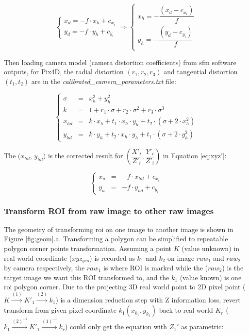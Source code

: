 \documentclass[doublespacing]{configs/bmcart}
\begin{document}
$$
\begin{cases}
  x_d = - f \cdot x_h + c_{x_i} \\
  y_d = - f \cdot y_h + c_{y_i}
\end{cases}
\Rightarrow
\begin{cases}
  x_h  = - \dfrac{(x_d - c_{x_i})}{f} \\
  y_h  = - \dfrac{(y_d - c_{y_i})}{f} \\
\end{cases}
$$

Then loading camera model (camera distortion coefficients) from \acrshort*{sfm} software outputs, for Pix4D, the radial distortion $(r_1, r_2, r_3)$ and tangential distortion $(t_1, t_2)$ are in the \textit{calibrated\_camera\_parameters.txt} file:

$$
  \left\{\begin{array}{lll}
    \sigma & = & x_h^2 + y_h^2 \\
    k      & = & 1 + r_1 \cdot \sigma + r_2 \cdot \sigma^2 + r_3 \cdot \sigma^3 \\
    x_{hd} & = & k \cdot x_h + t_1 \cdot x_h \cdot y_h + t_2 \cdot (\sigma + 2 \cdot x_h^2) \\
    y_{hd} & = & k \cdot y_h + t_2 \cdot x_h \cdot y_h + t_1 \cdot (\sigma + 2 \cdot y_h^2)
  \end{array} \right. \nonumber
$$

The $(x_{hd}$, $y_{hd})$ is the corrected result for $(\dfrac{X'_i}{Z'_i}, \dfrac{Y'_i}{Z'_i})$ in Equation \ref{eq:xyz'}:

$$
\left\{
  \begin{array}{lll}
    x_u & = & - f \cdot x_{hd} + c_{x_i} \\
    y_u & = & - f \cdot y_{hd} + c_{y_i}
  \end{array} 
\right.
$$

\subsubsection*{Transform ROI from raw image to other raw images}
The geometry of transforming \acrshort*{roi} on one image to another image is shown in Figure \ref{fig:geom}.a. Transforming a polygon can be simplified to repeatable polygon corner points transformation. Assuming a point $K$ (value unknown) in real world coordinate ($xyz_{geo}$) is recorded as $k_1$ and $k_2$ on image $raw_1$ and $raw_2$ by camera respectively, the $raw_1$ is where ROI is marked while the ($raw_2$) is the target image we want this ROI transformed to, and the $k_1$ (value known) is one \acrshort*{roi} polygon corner. Due to the projecting 3D real world point to 2D pixel point ($K \xrightarrow{(1)} K'_1 \xrightarrow{(2)} k_1$) is a dimension reduction step with Z information loss, revert transform from given pixel coordinate $k_1 (x_{k_1}, y_{k_1})$ back to real world $K_r$ ($k_1 \xrightarrow{(2)^{-1}} K'_1 \xrightarrow{(1)^{-1}} k_r$) could only get the equation with $Z_1'$ as parametric:
\end{document}
